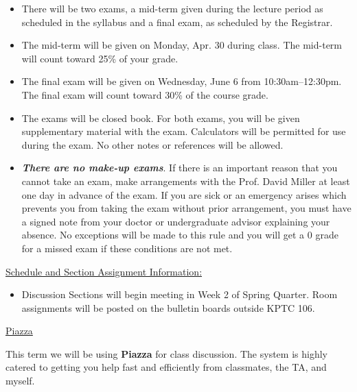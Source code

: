   \begin{itemize}
  
    \item There will be two exams, a mid-term given during the lecture period as scheduled in the syllabus and a final exam, as scheduled by the Registrar.
    \item The mid-term will be given on Monday, Apr. 30 during class.  The mid-term will count toward 25\% of your grade.
    \item The final exam will be given on Wednesday, June 6 from 10:30am--12:30pm. The final exam will count toward 30\% of the course grade.
    \item The exams will be closed book. For both exams, you will be given supplementary material with the exam. Calculators will be permitted for use during the exam. No other notes or references will be allowed.
    \item \textbf{\emph{There are no make-up exams}}. If there is an important reason that you cannot take an exam, make arrangements with the Prof. David Miller at least one day in advance of the exam. If you are sick or an emergency arises which prevents you from taking the exam without prior arrangement, you must have a signed note from your doctor or undergraduate advisor explaining your absence. No exceptions will be made to this rule and you will get a 0 grade for a missed exam if these conditions are not met.

  \end{itemize}  
  

\newpage  
\noindent \underline{Schedule and Section Assignment Information:}

  \begin{itemize}

    \item Discussion Sections will begin meeting in Week 2 of Spring Quarter.  Room assignments will be posted on the bulletin boards outside KPTC 106.

  \end{itemize}
  


\noindent \underline{Piazza}

\noindent This term we will be using \textbf{Piazza} for class discussion. The system is highly catered to getting you help fast and efficiently from classmates, the TA, and myself. 

